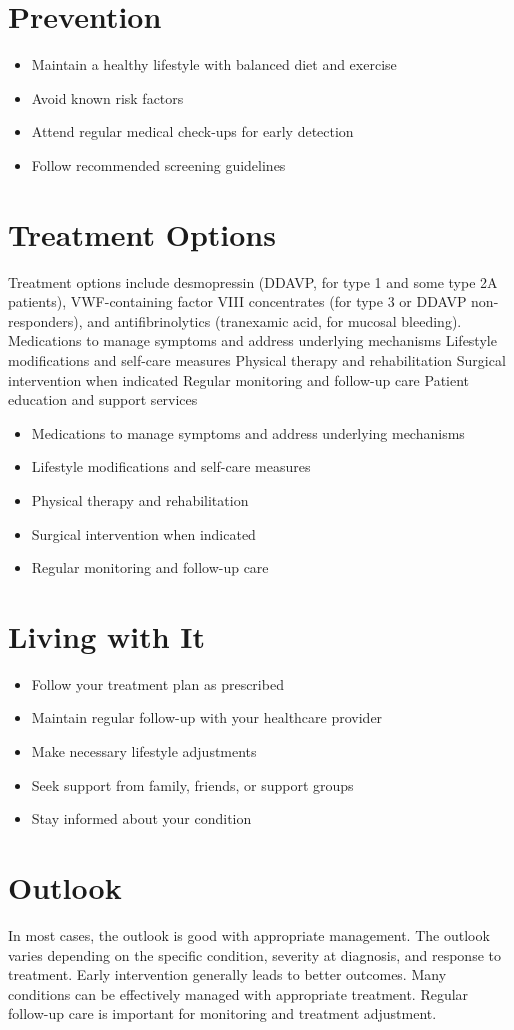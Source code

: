 \section{Prevention}
\begin{itemize}[noitemsep]
  \item Maintain a healthy lifestyle with balanced diet and exercise
  \item Avoid known risk factors
  \item Attend regular medical check-ups for early detection
  \item Follow recommended screening guidelines
\end{itemize}
\section{Treatment Options}
Treatment options include desmopressin (DDAVP, for type 1 and some type 2A patients), VWF-containing factor VIII concentrates (for type 3 or DDAVP non-responders), and antifibrinolytics (tranexamic acid, for mucosal bleeding). Medications to manage symptoms and address underlying mechanisms Lifestyle modifications and self-care measures Physical therapy and rehabilitation Surgical intervention when indicated Regular monitoring and follow-up care Patient education and support services

\begin{itemize}[noitemsep]
  \item Medications to manage symptoms and address underlying mechanisms
  \item Lifestyle modifications and self-care measures
  \item Physical therapy and rehabilitation
  \item Surgical intervention when indicated
  \item Regular monitoring and follow-up care
\end{itemize}
\section{Living with It}
\begin{itemize}[noitemsep]
  \item Follow your treatment plan as prescribed
  \item Maintain regular follow-up with your healthcare provider
  \item Make necessary lifestyle adjustments
  \item Seek support from family, friends, or support groups
  \item Stay informed about your condition
\end{itemize}
\section{Outlook}
In most cases, the outlook is good with appropriate management. The outlook varies depending on the specific condition, severity at diagnosis, and response to treatment. Early intervention generally leads to better outcomes. Many conditions can be effectively managed with appropriate treatment. Regular follow-up care is important for monitoring and treatment adjustment.
